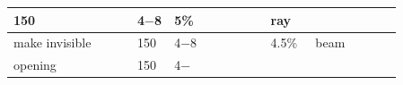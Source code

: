 \begin{longtable}{|>{\RaggedRight}p{0.27477\linewidth}|>{\RaggedRight}p{0.08330\linewidth}|>{\RaggedRight}p{0.21924\linewidth}|>{\RaggedRight}p{0.08716\linewidth}|>{\RaggedRight}p{0.19267\linewidth}|}
{}\hspace*{0pt}150&\hspace*{0pt}\ignorespaces{}\hspace*{0pt}4{\mbox{$-$}}8&\hspace*{0pt}\ignorespaces{}\hspace*{0pt}5\%&\hspace*{0pt}\ignorespaces{}\hspace*{0pt}ray\\ \hline \hspace*{0pt}\ignorespaces{}\hspace*{0pt}make invisible\footnotemark[31]&\hspace*{0pt}\ignorespaces{}\hspace*{0pt}150&\hspace*{0pt}\ignorespaces{}\hspace*{0pt}4{\mbox{$-$}}8&\hspace*{0pt}\ignorespaces{}\hspace*{0pt}4.5\%&\hspace*{0pt}\ignorespaces{}\hspace*{0pt}beam\\ \hline \hspace*{0pt}\ignorespaces{}\hspace*{0pt}opening\footnotemark[32]&\hspace*{0pt}\ignorespaces{}\hspace*{0pt}150&\hspace*{0pt}\ignorespaces{}\hspace*{0pt}4{\mbox{$-$}}
\end{longtable}
